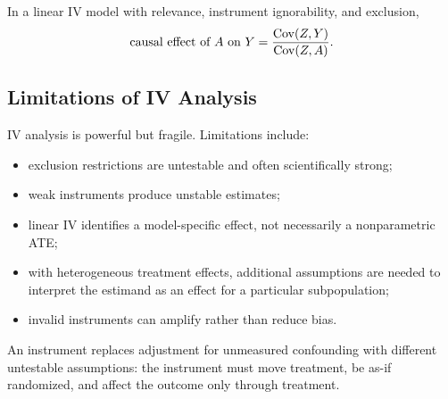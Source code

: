 \begin{identificationbox}
In a linear IV model with relevance, instrument ignorability, and exclusion,
\[
  \text{causal effect of }A\text{ on }Y
  =
  \frac{\operatorname{Cov}(Z,Y)}{\operatorname{Cov}(Z,A)}.
\]
\end{identificationbox}

\subsection{Limitations of IV Analysis}

IV analysis is powerful but fragile. Limitations include:
\begin{itemize}
  \item exclusion restrictions are untestable and often scientifically strong;
  \item weak instruments produce unstable estimates;
  \item linear IV identifies a model-specific effect, not necessarily a
  nonparametric ATE;
  \item with heterogeneous treatment effects, additional assumptions are needed
  to interpret the estimand as an effect for a particular subpopulation;
  \item invalid instruments can amplify rather than reduce bias.
\end{itemize}

\begin{keyidea}
An instrument replaces adjustment for unmeasured confounding with different
untestable assumptions: the instrument must move treatment, be as-if randomized,
and affect the outcome only through treatment.
\end{keyidea}
